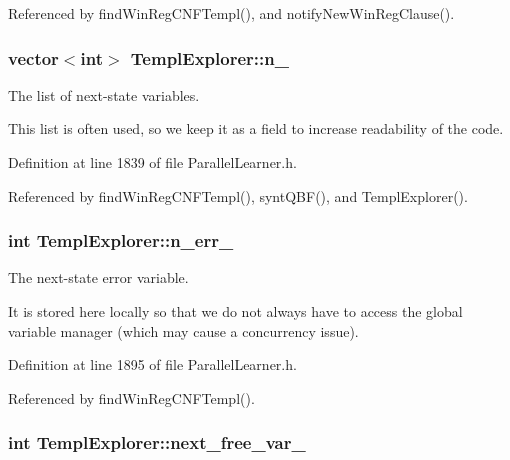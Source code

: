 Referenced by find\-Win\-Reg\-C\-N\-F\-Templ(), and notify\-New\-Win\-Reg\-Clause().

\hypertarget{classTemplExplorer_a58af33d991f5670d856dec1358e2faea}{
\subsubsection[{n\-\_\-}]{\setlength{\rightskip}{0pt plus 5cm}vector$<$int$>$ Templ\-Explorer\-::n\-\_\-\hspace{0.3cm}{\ttfamily [protected]}}}\label{classTemplExplorer_a58af33d991f5670d856dec1358e2faea}


The list of next-\/state variables. 

This list is often used, so we keep it as a field to increase readability of the code. 

Definition at line 1839 of file Parallel\-Learner.\-h.



Referenced by find\-Win\-Reg\-C\-N\-F\-Templ(), synt\-Q\-B\-F(), and Templ\-Explorer().

\hypertarget{classTemplExplorer_af4e2d68befa5a10d76614da4cbd5f4f3}{
\subsubsection[{n\-\_\-err\-\_\-}]{\setlength{\rightskip}{0pt plus 5cm}int Templ\-Explorer\-::n\-\_\-err\-\_\-\hspace{0.3cm}{\ttfamily [protected]}}}\label{classTemplExplorer_af4e2d68befa5a10d76614da4cbd5f4f3}


The next-\/state error variable. 

It is stored here locally so that we do not always have to access the global variable manager (which may cause a concurrency issue). 

Definition at line 1895 of file Parallel\-Learner.\-h.



Referenced by find\-Win\-Reg\-C\-N\-F\-Templ().

\hypertarget{classTemplExplorer_ab0f61981e91a348778822f69ea1b58ee}{
\subsubsection[{next\-\_\-free\-\_\-var\-\_\-}]{\setlength{\rightskip}{0pt plus 5cm}int Templ\-Explorer\-::next\-\_\-free\-\_\-var\-\_\-\hspace{0.3cm}{\ttfamily [protected]}}}\label{classTemplExplorer_ab0f61981e91a348778822f69ea1b58ee}


